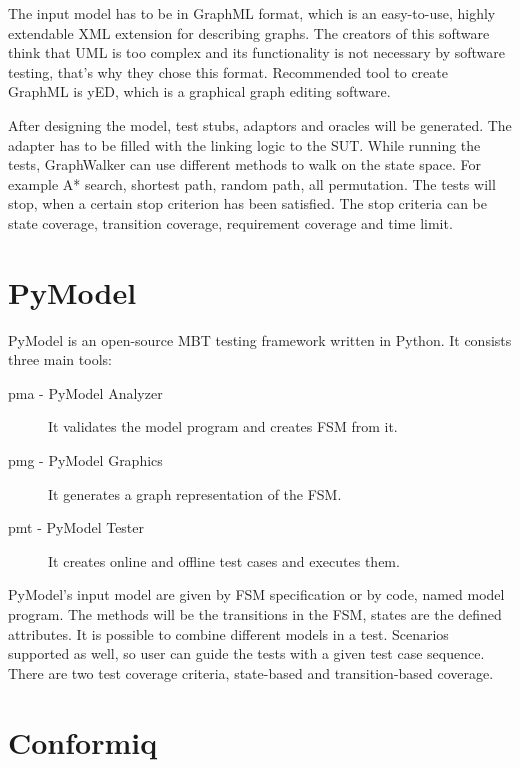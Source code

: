 The input model has to be in GraphML format, which is an easy-to-use, highly extendable XML extension for describing graphs. The creators of this software think that UML is too complex and its functionality is not necessary by software testing, that's why they chose this format. Recommended tool to create GraphML is yED, which is a graphical graph editing software.

After designing the model, test stubs, adaptors and oracles will be generated. The adapter has to be filled with the linking logic to the SUT. While running the tests, GraphWalker can use different methods to walk on the state space. For example A* search, shortest path, random path, all permutation. The tests will stop, when a certain stop criterion has been satisfied. The stop criteria can be state coverage, transition coverage, requirement coverage and time limit.


\section{PyModel}
\label{sec:pymodel}

PyModel \cite{pymodelarticle}\cite{pymodel} is an open-source MBT testing framework written in Python. It consists three main tools:

\begin{description}
	\item[pma - PyModel Analyzer] It validates the model program and creates FSM from it.
	\item[pmg - PyModel Graphics] It generates a graph representation of the FSM.
    	\item[pmt - PyModel Tester] It creates online and offline test cases and executes them.
\end{description}

PyModel's input model are given by FSM specification or by code, named model program. The methods will be the transitions in the FSM, states are the defined attributes. It is possible to combine different models in a test. Scenarios supported as well, so user can guide the tests with a given test case sequence. There are two test coverage criteria, state-based and transition-based coverage.


\section{Conformiq}
\label{sec:conformiq}

